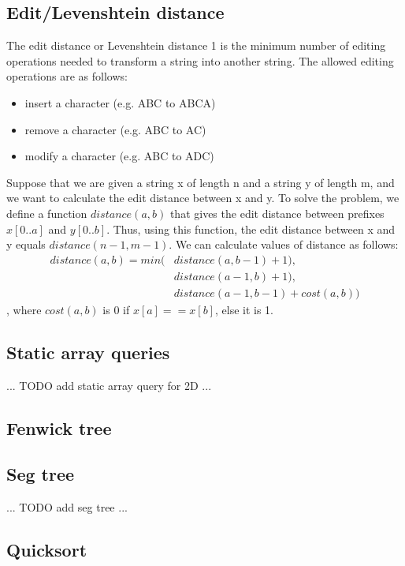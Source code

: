 \documentclass[a4paper]{article}
\begin{document}
\subsection{Edit/Levenshtein distance}
The edit distance or Levenshtein distance 1 is the minimum number of editing operations needed to transform a string into another string. The allowed editing operations are as follows:
\begin{itemize}
  \item insert a character (e.g. ABC to ABCA)
  \item remove a character (e.g. ABC to AC)
  \item modify a character (e.g. ABC to ADC)
\end{itemize}
Suppose that we are given a string x of length n and a string y of length m, and we want to calculate the edit distance between x and y. To solve the problem, we define a function $distance(a, b)$ that gives the edit distance between prefixes
$x[0..a]$ and $y[0..b]$. Thus, using this function, the edit distance between x and y equals $distance(n - 1, m - 1)$.
We can calculate values of distance as follows:
\begin{align}
  distance(a, b) = min(&distance(a, b - 1) + 1), \\
                       &distance(a - 1, b) + 1), \\
                       &distance(a - 1, b - 1) + cost(a, b))
\end{align}
, where $cost(a, b)$ is 0 if $x[a] == x[b]$, else it is 1.


\subsection{Static array queries}
... TODO add static array query for 2D ...


\subsection{Fenwick tree}


\subsection{Seg tree}
... TODO add seg tree ...


\subsection{Quicksort}

\end{document}
